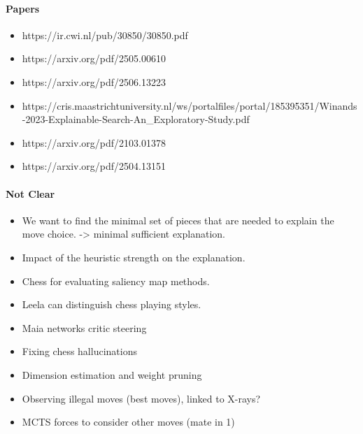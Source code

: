 \paragraph{Papers}
\begin{itemize}
    \item https://ir.cwi.nl/pub/30850/30850.pdf
    \item https://arxiv.org/pdf/2505.00610
    \item https://arxiv.org/pdf/2506.13223
    \item https://cris.maastrichtuniversity.nl/ws/portalfiles/portal/185395351/Winands-2023-Explainable-Search-An\_Exploratory-Study.pdf
    \item https://arxiv.org/pdf/2103.01378
    \item https://arxiv.org/pdf/2504.13151
\end{itemize}

\paragraph{Not Clear}
\begin{itemize}
    \item We want to find the minimal set of pieces that are needed to explain the move choice. -> minimal sufficient explanation.
    \item Impact of the heuristic strength on the explanation.
    \item Chess for evaluating saliency map methods.
    \item Leela can distinguish chess playing styles.
    \item Maia networks critic steering
    \item Fixing chess hallucinations
    \item Dimension estimation and weight pruning
    \item Observing illegal moves (best moves), linked to X-rays?
    \item MCTS forces to consider other moves (mate in 1)
\end{itemize}
